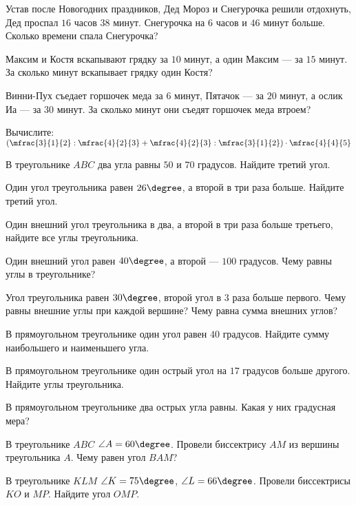 
\begin{homework}[number=1]
	\begin{listofex}
		\item Устав после Новогодних праздников, Дед Мороз и Снегурочка решили отдохнуть, Дед проспал \( 16 \) часов \( 38 \) минут. Снегурочка на \( 6 \) часов и \( 46 \) минут больше. Сколько времени спала Снегурочка?
		\item Максим и Костя вскапывают грядку за \( 10 \) минут, а один Максим --- за \( 15 \) минут. За сколько минут	вскапывает грядку один Костя?
		\item Винни-Пух съедает горшочек меда за \( 6 \) минут, Пятачок --- за \( 20 \) минут, а ослик Иа --- за \( 30 \) минут. За сколько минут они съедят горшочек меда втроем?
		\item Вычислите: \quad \( \left( \mfrac{3}{1}{2}:\mfrac{4}{2}{3}+\mfrac{4}{2}{3}:\mfrac{3}{1}{2} \right)\cdot\mfrac{4}{4}{5} \)
	\end{listofex}
\end{homework}

\begin{class}[number=3]
	\begin{listofex}
		\item В треугольнике \( ABC \) два угла равны \( 50\) и \( 70 \) градусов. Найдите третий угол.
		\item Один угол треугольника равен \( 26\degree \), а второй в три раза больше. Найдите третий угол.
		\item Один внешний угол треугольника в два, а второй в три раза больше третьего, найдите все углы треугольника.
		\item Один внешний угол равен \( 40\degree \), а второй --- \( 100 \) градусов. Чему равны углы в треугольнике? 
		\item Угол треугольника равен \( 30\degree \), второй угол в \( 3 \) раза больше первого. Чему равны внешние углы при каждой вершине? Чему равна сумма внешних углов?
		\item В прямоугольном треугольнике один угол равен \( 40 \) градусов. Найдите сумму наибольшего и наименьшего угла. 
		\item В прямоугольном треугольнике один острый угол на \( 17 \) градусов больше другого. Найдите углы треугольника.
		\item В прямоугольном треугольнике два острых угла равны. Какая у них градусная мера?
		\item В треугольнике \( ABC \) \( \angle A=60\degree \). Провели биссектрису \( AM \) из вершины треугольника \( A \). Чему равен угол \( BAM \)?
		\item В треугольнике \( KLM \) \( \angle K=75\degree \), \(\angle L=66\degree \). Провели биссектрисы \( KO \) и \( MP \). Найдите угол \( OMP \).
	\end{listofex}
\end{class}

